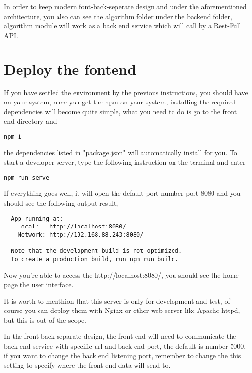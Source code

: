 \documentclass{article}
\begin{document}
In order to keep modern font-back-seperate design and
under the aforementioned architecture, you also can see the algorithm folder under the backend folder, algorithm module will work as a back end service which will call by a Rest-Full API.


\section{Deploy the fontend}
If you have settled the environment by the previous instructions, you should have  on your system, once you get the npm on your system, installing the required dependencies will become quite simple, what you need to do is go to the front end directory and
\begin{mdframed}[backgroundcolor=bg]
\begin{verbatim}
npm i
\end{verbatim}
\end{mdframed}
the dependencies listed in "package.json" will automatically install for you.\newline
To start a developer server, type the following instruction on the terminal and enter
\begin{mdframed}[backgroundcolor=bg]
\begin{verbatim}
npm run serve
\end{verbatim}
\end{mdframed}
If everything goes well, it will open the default port number port 8080 and you should see the following output result,
\begin{mdframed}[backgroundcolor=bg]
\begin{verbatim}
  App running at:
  - Local:   http://localhost:8080/ 
  - Network: http://192.168.88.243:8080/

  Note that the development build is not optimized.
  To create a production build, run npm run build.
\end{verbatim}
\end{mdframed}

Now you're able to access the http://localhost:8080/,
you should see the home page the user interface.


It is worth to menthion that this server is only for development and test, of course you can deploy them with Nginx or other web server like Apache httpd, but this is out of the scope. 

In the front-back-separate design, the front end will need to communicate the back end service with specific url and back end port, the default is number 5000, if you want to change the back end listening port, remember to change the this setting to specify where the front end data will send to.
\end{document}
